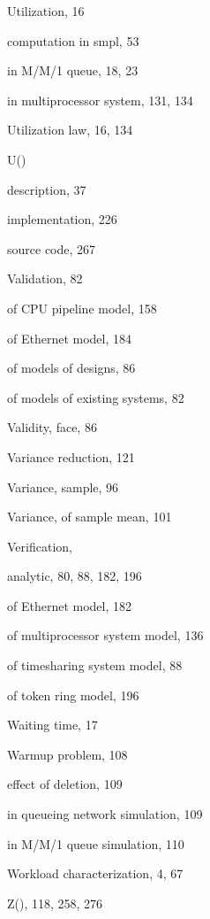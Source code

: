 \noindent Utilization, 16\par
\quad computation in smpl, 53\par
\quad in M/M/1 queue, 18, 23\par
\quad in multiprocessor system, 131, 134\par
\noindent Utilization law, 16, 134\par
\noindent U()\par
\quad description, 37\par
\quad implementation, 226\par
\quad source code, 267\par
\noindent Validation, 82\par
\quad of CPU pipeline model, 158\par
\quad of Ethernet model, 184\par
\quad of models of designs, 86\par
\quad of models of existing systems, 82\par
\noindent Validity, face, 86\par
\noindent Variance reduction, 121\par
\noindent Variance, sample, 96\par
\noindent Variance, of sample mean, 101\par
\noindent Verification,\par
\quad analytic, 80, 88, 182, 196\par
\quad of Ethernet model, 182\par
\quad of multiprocessor system model, 136\par
\quad of timesharing system model, 88\par
\quad of token ring model, 196\par
\noindent Waiting time, 17\par
\noindent Warmup problem, 108\par
\quad effect of deletion, 109\par
\quad in queueing network simulation, 109\par
\quad in M/M/1 queue simulation, 110\par
\noindent Workload characterization, 4, 67\par
\noindent Z(), 118, 258, 276\par
